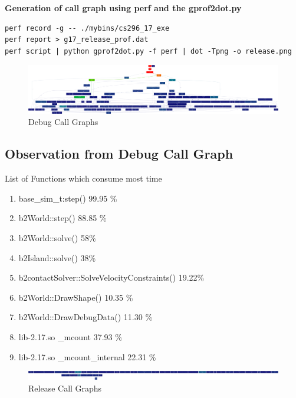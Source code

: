 \documentclass[11pt,]{article}
\begin{document}
\begin{singlespace}
\textbf{Generation of call graph using perf and the gprof2dot.py} \\
\begin{lstlisting}
perf record -g -- ./mybins/cs296_17_exe
perf report > g17_release_prof.dat
perf script | python gprof2dot.py -f perf | dot -Tpng -o release.png
\end{lstlisting}

\begin{figure}[h!]
	\centering
	\caption{Debug Call Graphs}
		\includegraphics[width=1\textwidth]{debug.png}
\end{figure}

\subsection*{Observation from Debug Call Graph}
List of Functions which consume most time
\begin{enumerate}
    \item base\_sim\_t:step() 99.95 \%
    \item b2World::step() 88.85 \%
    \item b2World::solve() 58\%
    \item b2Island::solve() 38\%
    \item b2contactSolver::SolveVelocityConstraints() 19.22\%
    \item b2World::DrawShape() 10.35 \%
    \item b2World::DrawDebugData() 11.30 \%
    \item lib-2.17.so \_mcount 37.93 \%
    \item lib-2.17.so \_mcount\_internal 22.31 \%
\end{enumerate}

\begin{figure}[h!]
	\centering
	\caption{Release Call Graphs}
		\includegraphics[width=1\textwidth]{release.png}
\end{figure}


\end{singlespace}
\end{document}

